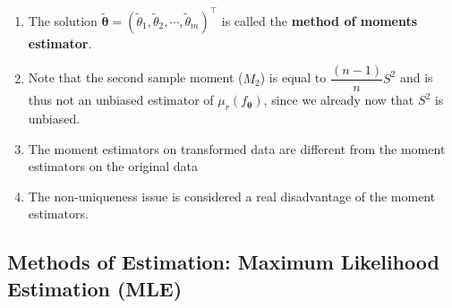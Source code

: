 \begin{enumerate}
    \item The solution $\tilde{\bm{\theta}} = ( \tilde{\theta}_1, \tilde{\theta}_2, \cdots , \tilde{\theta}_m )^\top$ is called the \textbf{method of moments estimator}.
    \hfill \cite{statistics/book/Statistics-for-Data-Scientists/Maurits-Kaptein}

    \item Note that the second sample moment ($M_2$) is equal to $\dfrac{(n - 1)}{n}S^2$ and is thus not an unbiased estimator of $\mu_r ( f_{\bm{\theta}} )$, since we already now that $S^2$ is unbiased.
    \hfill \cite{statistics/book/Statistics-for-Data-Scientists/Maurits-Kaptein}

    \item The moment estimators on transformed data are different from the moment estimators on the original data
    \hfill \cite{statistics/book/Statistics-for-Data-Scientists/Maurits-Kaptein}

    \item The non-uniqueness issue is considered a real disadvantage of the moment estimators.
    \hfill \cite{statistics/book/Statistics-for-Data-Scientists/Maurits-Kaptein}
\end{enumerate}




\subsection{Methods of Estimation: Maximum Likelihood Estimation (MLE)}

